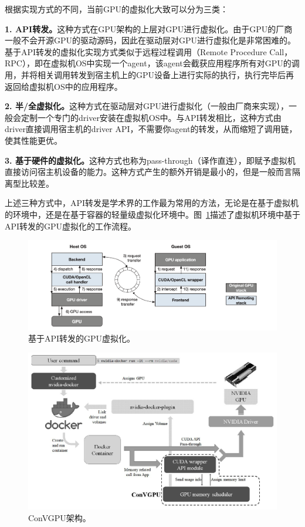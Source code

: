 根据实现方式的不同，当前GPU的虚拟化大致可以分为三类\parencite{hong2017gpu}：

\textbf{1. API转发。}这种方式在GPU架构的上层对GPU进行虚拟化。由于GPU的厂商一般不会开源GPU的驱动源码，因此在驱动层对GPU进行虚拟化是非常困难的。基于API转发的虚拟化实现方式类似于远程过程调用（Remote Procedure Call，RPC），即在虚拟机OS中实现一个agent，该agent会截获应用程序所有对GPU的调用，并将相关调用转发到宿主机上的GPU设备上进行实际的执行，执行完毕后再返回给虚拟机OS中的应用程序。

\textbf{2. 半/全虚拟化。}这种方式在驱动层对GPU进行虚拟化（一般由厂商来实现），一般会定制一个专门的driver安装在虚拟机OS中。与API转发相比，这种方式由driver直接调用宿主机的driver API，不需要你agent的转发，从而缩短了调用链，使其性能更优。

\textbf{3. 基于硬件的虚拟化。}这种方式也称为pass-through（译作直连），即赋予虚拟机直接访问宿主机设备的能力。这种方式产生的额外开销是最小的，但是一般而言隔离型比较差。

上述三种方式中，API转发是学术界的工作最为常用的方法，无论是在基于虚拟机的环境中，还是在基于容器的轻量级虚拟化环境中。图~\ref{api_remoting}描述了虚拟机环境中基于API转发的GPU虚拟化的工作流程。

\begin{figure}[h]
    \centerline{\includegraphics[width=\textwidth]{figures/api-remoting.png}}
    \caption{基于API转发的GPU虚拟化。}
    \label{api_remoting}
\end{figure}

\begin{figure}[h]
    \centerline{\includegraphics[width=\textwidth]{figures/convgpu.png}}
    \caption{ConVGPU架构。}
    \label{convgpu_arch}
\end{figure}

